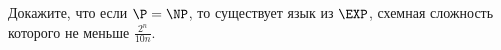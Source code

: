 Докажите, что если $\P = \NP$, то существует язык из $\EXP$, схемная сложность которого не меньше
$\frac{2^n}{10 n}$.
